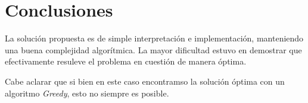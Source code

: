 \section{Conclusiones}

La soluci\'on propuesta es de simple interpretaci\'on e implementaci\'on, manteniendo una buena complejidad algor\'itmica. La mayor dificultad estuvo en demostrar que efectivamente resuleve el problema en cuesti\'on de manera \'optima.

Cabe aclarar que si bien en este caso encontramso la soluci\'on \'optima con un algoritmo \textit{Greedy}, esto no siempre es posible.
